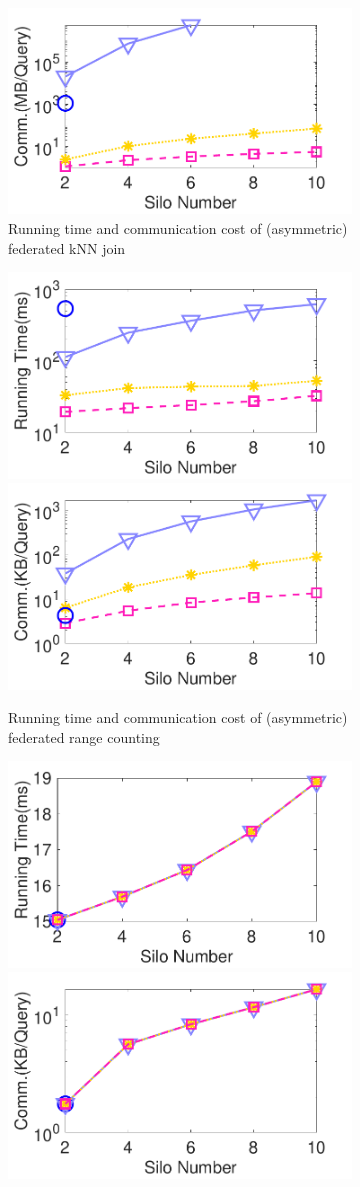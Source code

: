 \begin{figure}[t]
\begin{subfigure}{0.48\textwidth}
        \includegraphics[width=0.48\linewidth]{apdx/knnjoin_silo_cost.pdf}
        \caption{Running time and communication cost of (asymmetric) federated kNN join}
        \label{fig:knn-j-eff-silo-n-ho}
    \end{subfigure}
    \begin{subfigure}{0.48\textwidth}
        \centering
        \includegraphics[width=0.48\linewidth]{apdx/rangecount_silo_time.pdf}
        \includegraphics[width=0.48\linewidth]{apdx/rangecount_silo_cost.pdf}
        \caption{Running time and communication cost of (asymmetric) federated range counting}
        \label{fig:count-eff-silo-n-ho}
    \end{subfigure}
     \begin{subfigure}{0.48\textwidth}
        \centering
        \includegraphics[width=0.48\linewidth]{apdx/rangequery_silo_time.pdf}
        \includegraphics[width=0.48\linewidth]{apdx/rangequery_silo_cost.pdf}

\end{subfigure}
\end{figure}
